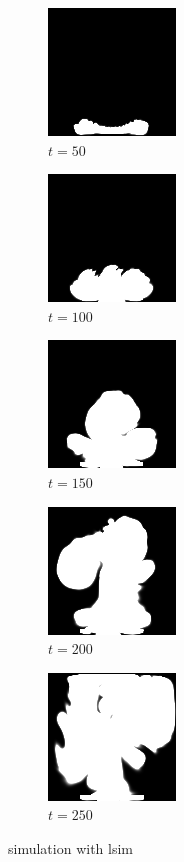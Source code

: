 \documentclass[a4paper,12pt,twoside]{report}
\begin{document}
\begin{figure}
\centering
\begin{subfigure}{0.18\textwidth}
  \centering
  \includegraphics[scale=0.56]{buoyancy_test/dens_000050_lsim.png}
  \caption{$t=50$}
\end{subfigure}
\begin{subfigure}{0.18\textwidth}
  \centering
  \includegraphics[scale=0.56]{buoyancy_test/dens_000100_lsim.png}
  \caption{$t=100$}
\end{subfigure}
\begin{subfigure}{0.18\textwidth}
  \centering
  \includegraphics[scale=0.56]{buoyancy_test/dens_000150_lsim.png}
  \caption{$t=150$}
\end{subfigure}
\begin{subfigure}{0.18\textwidth}
  \centering
  \includegraphics[scale=0.56]{buoyancy_test/dens_000200_lsim.png}
  \caption{$t=200$}
\end{subfigure}
\begin{subfigure}{0.18\textwidth}
  \centering
  \includegraphics[scale=0.56]{buoyancy_test/dens_000249_lsim.png}
  \caption{$t=250$}
\end{subfigure}
\caption{simulation with lsim}
\end{figure}
\end{document}

